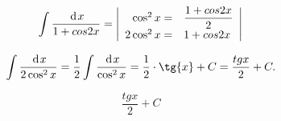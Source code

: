 {}

$$
\int \dfrac{\hspace{2pt}\text{d}\hspace{1pt}{x}}{1+cos2x} = \Bigg |
  \begin{array}{r l }
    \cos^2x = & \dfrac{1+cos2x}{2} \\
    2 \cos^2x = & 1+cos2x \\
  \end{array}
\Bigg |
$$

$$
  \int \dfrac{\d{x}}{2\cos^2x}
  = \dfrac{1}{2} \int \dfrac{\d{x}}{\cos^2x}
  = \dfrac{1}{2} \cdot \tg{x} + C
  = \frac{tg{x}}{2} + C.
$$

$$
  \boxed{\frac{tg{x}}{2} + C}
$$
